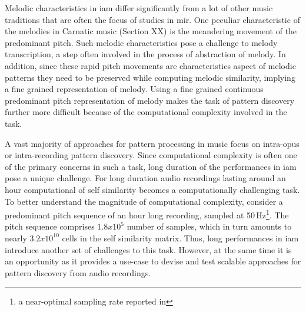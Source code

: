 Melodic characteristics in \gls{iam} differ significantly from a lot of other music traditions that are often the focus of studies in \gls{mir}. One peculiar characteristic of the melodies in Carnatic music (Section XX) is the meandering movement of the predominant pitch. Such melodic characteristics pose a challenge to melody transcription, a step often involved in the process of abstraction of melody. In addition, since these rapid pitch movements are characteristics aspect of melodic patterns they need to be preserved while computing melodic similarity, implying a fine grained representation of melody. Using a fine grained continuous predominant pitch representation of melody makes the task of pattern discovery further more difficult because of the computational complexity involved in the task.



A vast majority of approaches for pattern processing in music focus on intra-opus or intra-recording pattern discovery. Since computational complexity is often one of the primary concerns in such a task, long duration of the performances in \gls{iam} pose a unique challenge. For long duration audio recordings lasting around an hour computational of self similarity becomes a computationally challenging task. To better understand the magnitude of computational complexity, consider a predominant pitch sequence of an hour long recording, sampled at 50\,Hz\footnote{a near-optimal sampling rate reported in }. The pitch sequence comprises $1.8x10^{5}$ number of samples, which in turn amounts to nearly $3.2x10^{10}$ cells in the self similarity matrix.  Thus, long performances in \gls{iam} introduce another set of challenges to this task. However, at the same time it is an opportunity as it provides a use-case to devise and test scalable approaches for pattern discovery from audio recordings. 



